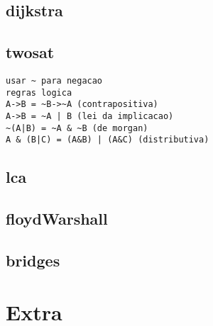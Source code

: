 \vspace{-2pt}
\subsection{dijkstra}
\vspace{-5pt}
\raggedbottom
\hrulefill

\vspace{-2pt}
\subsection{twosat}
\vspace{-4pt}
\begin{lstlisting}[style=description]
usar ~ para negacao
regras logica
A->B = ~B->~A (contrapositiva)
A->B = ~A | B (lei da implicacao)
~(A|B) = ~A & ~B (de morgan)
A & (B|C) = (A&B) | (A&C) (distributiva)

\end{lstlisting}
\vspace{-5pt}
\raggedbottom
\hrulefill

\vspace{-2pt}
\subsection{lca}
\vspace{-5pt}
\raggedbottom
\hrulefill

\vspace{-2pt}
\subsection{floydWarshall}
\vspace{-5pt}
\raggedbottom
\hrulefill

\vspace{-2pt}
\subsection{bridges}
\vspace{-5pt}
\raggedbottom
\hrulefill


\section{Extra}
\vspace{-2pt}
